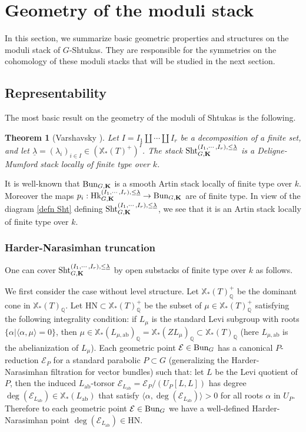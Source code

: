\documentclass[11pt]{amsart}
\numberwithin{equation}{section}
\theoremstyle{plain}
\newtheorem{theorem}[subsubsection]{Theorem}
\theoremstyle{definition}
\def\QQ{\mathbb{Q}}
\newcommand\cE{\mathcal{E}}
\def\bK{\mathbf{K}}
\newcommand{\Bun}{\textup{Bun}}
\newcommand{\Hk}{\textup{Hk}}
\newcommand\Sht{\textup{Sht}}
\newcommand\xcoch{\mathbb{X}_*}
\renewcommand{\j}[1]{\langle{#1}\rangle}
\newcommand\un{\underline}
\newcommand\sss{\subsubsection}
\renewcommand\a\alpha
\renewcommand{\l}{\lambda}
\newcommand{\HN}{\mathrm{HN}}
\newcommand{\ab}{\mathrm{ab}}
\begin{document}
\section{Geometry of the moduli stack}\label{s:geom}
In this section, we summarize basic geometric properties and structures on the moduli stack of $G$-Shtukas. They are responsible for the symmetries on the cohomology of these moduli stacks that will be studied in the next section.



\subsection{Representability}
The most basic result on the geometry of the moduli of Shtukas is the following.
\begin{theorem}[Varshavsky {\cite[Proposition 2.16(a)]{Var}}] Let $I=I_{1}\coprod\cdots\coprod I_{r}$ be a decomposition of a finite set, and let $\un\l=(\l_{i})_{i\in I}\in (\xcoch(T)^{+})^{I}$. The stack $\Sht^{(I_{1},\cdots, I_{r}), \le \un\l}_{G,\bK}$ is a Deligne-Mumford stack locally of finite type over $k$.
\end{theorem}

It is well-known that $\Bun_{G,\bK}$ is a smooth Artin stack locally of finite type over $k$. Moreover the maps $p_{i}: \Hk_{G,\bK}^{(I_{1},\cdots, I_{r}), \le \un\l}\to \Bun_{G,\bK}$ are of finite type. In view of the diagram \eqref{defn Sht} defining $\Sht^{(I_{1},\cdots, I_{r}), \le\un\l}_{G,\bK}$, we see that it is an Artin stack locally of finite type over $k$. 

\sss{Harder-Narasimhan truncation}\label{sss:HN}
One can cover $\Sht^{(I_{1},\cdots, I_{r}), \le \un\l}_{G,\bK}$ by open substacks of finite type over $k$ as follows. 

We first consider the case without level structure. Let $\xcoch(T)^{+}_{\QQ}$ be the dominant cone in $\xcoch(T)_{\QQ}$. Let $\HN\subset \xcoch(T)^{+}_{\QQ}$ be the subset of $\mu\in \xcoch(T)_{\QQ}^{+}$ satisfying the following integrality condition:  if $L_{\mu}$ is the standard Levi subgroup with roots $\{\a|\j{\a,\mu}=0\}$, then $\mu\in \xcoch(L_{\mu,\ab})_{\QQ}=\xcoch(ZL_{\mu})_{\QQ}\subset\xcoch(T)_{\QQ}$ (here $L_{\mu,\ab}$ is the abelianization of $L_{\mu}$).   Each geometric point $\cE\in \Bun_{G}$ has a canonical $P$-reduction $\cE_{P}$ for a standard parabolic $P\subset G$ (generalizing the Harder-Narasimhan filtration for vector bundles) such that: let $L$ be the Levi quotient of $P$, then the induced $L_{\ab}$-torsor $\cE_{L_{\ab}}=\cE_{P}/(U_{P}[L,L])$ has degree $\deg(\cE_{L_{\ab}})\in \xcoch(L_{\ab})$ that satisfy $\j{\a, \deg(\cE_{L_{\ab}})}>0$ for all roots $\a$ in $U_{P}$. Therefore to each geometric point $\cE\in \Bun_{G}$ we have a well-defined Harder-Narasimhan point $\deg(\cE_{L_{\ab}})\in \HN$.
\end{document}
